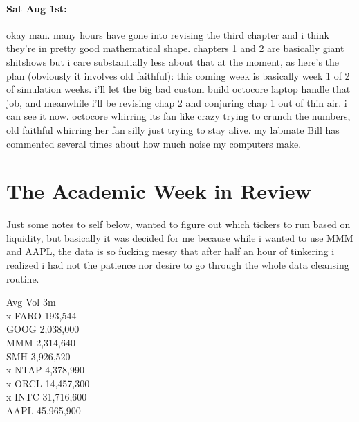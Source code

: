 \documentclass[12pt]{article}
\begin{document}
\paragraph{Sat Aug 1st:} okay man. many hours have gone into revising the third chapter and i think they're in pretty good mathematical shape. chapters 1 and 2 are basically giant shitshows but i care substantially less about that at the moment, as here's the plan (obviously it involves old faithful): this coming week is basically week 1 of 2 of simulation weeks. i'll let the big bad custom build octocore laptop handle that job, and meanwhile i'll be revising chap 2 and conjuring chap 1 out of thin air. i can see it now. octocore whirring its fan like crazy trying to crunch the numbers, old faithful whirring her fan silly just trying to stay alive. my labmate Bill has commented several times about how much noise my computers make. 

\section*{The Academic Week in Review}
Just some notes to self below, wanted to figure out which tickers to run based on liquidity, but basically it was decided for me because while i wanted to use MMM and AAPL, the data is so fucking messy that after half an hour of tinkering i realized i had not the patience nor desire to go through the whole data cleansing routine. 

Avg Vol 3m \\
x FARO 193,544 \\
GOOG 2,038,000 \\
MMM 2,314,640 \\ 
SMH 3,926,520\\
x NTAP 4,378,990 \\
x ORCL 14,457,300 \\
x INTC 31,716,600 \\
AAPL 45,965,900 \\
\end{document}
